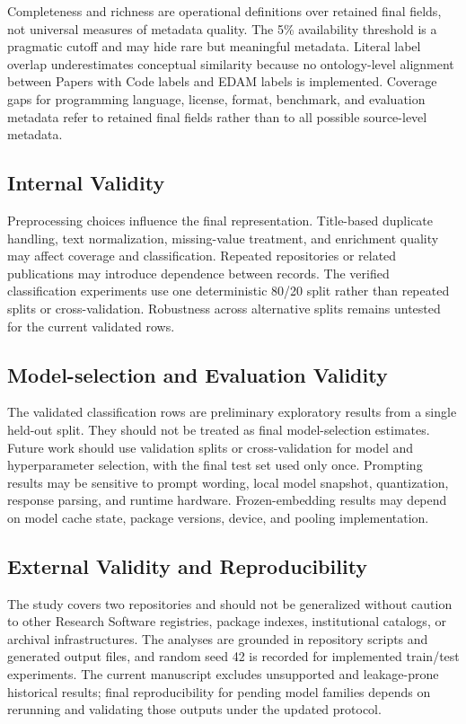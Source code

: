 \documentclass[pdflatex,sn-mathphys-num]{sn-jnl}
\theoremstyle{thmstyleone}%
\theoremstyle{thmstyletwo}%
\theoremstyle{thmstylethree}%
\begin{document}
Completeness and richness are operational definitions over retained final fields, not universal measures of metadata quality. The 5\% availability threshold is a pragmatic cutoff and may hide rare but meaningful metadata. Literal label overlap underestimates conceptual similarity because no ontology-level alignment between Papers with Code labels and EDAM labels is implemented. Coverage gaps for programming language, license, format, benchmark, and evaluation metadata refer to retained final fields rather than to all possible source-level metadata.

\subsection{Internal Validity}
\label{subsec:threats-internal}

Preprocessing choices influence the final representation. Title-based duplicate handling, text normalization, missing-value treatment, and enrichment quality may affect coverage and classification. Repeated repositories or related publications may introduce dependence between records. The verified classification experiments use one deterministic 80/20 split rather than repeated splits or cross-validation. Robustness across alternative splits remains untested for the current validated rows.

\subsection{Model-selection and Evaluation Validity}
\label{subsec:threats-model-selection}

The validated classification rows are preliminary exploratory results from a single held-out split. They should not be treated as final model-selection estimates. Future work should use validation splits or cross-validation for model and hyperparameter selection, with the final test set used only once. Prompting results may be sensitive to prompt wording, local model snapshot, quantization, response parsing, and runtime hardware. Frozen-embedding results may depend on model cache state, package versions, device, and pooling implementation.

\subsection{External Validity and Reproducibility}
\label{subsec:threats-external}

The study covers two repositories and should not be generalized without caution to other Research Software registries, package indexes, institutional catalogs, or archival infrastructures. The analyses are grounded in repository scripts and generated output files, and random seed 42 is recorded for implemented train/test experiments. The current manuscript excludes unsupported and leakage-prone historical results; final reproducibility for pending model families depends on rerunning and validating those outputs under the updated protocol.
\end{document}
